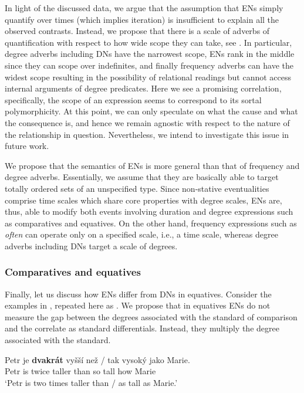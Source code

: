 \documentclass[output=paper,modfonts,hidelinks,newtxmath
\ChapterDOI{10.5281/zenodo.2545513}
]{langscibook}
\begin{document}
\noindent In light of the discussed data, we argue that the assumption that ENs simply quantify over times (which implies iteration) is insufficient to explain all the observed contrasts. Instead, we propose that there is a scale of adverbs of quantification with respect to how wide scope they can take, see . In particular, degree adverbs including DNs have the narrowest scope, ENs rank in the middle since they can scope over indefinites, and finally frequency adverbs can have the widest scope resulting in the possibility of relational readings but cannot access internal arguments of degree predicates. Here we see a promising correlation, specifically, the scope of an expression seems to correspond to its sortal polymorphicity. At this point, we can only speculate on what the cause and what the consequence is, and hence we remain agnostic with respect to the nature of the relationship in question. Nevertheless, we intend to investigate this issue in future work.


We propose that the semantics of ENs is more general than that of frequency and degree adverbs. Essentially, we assume that they are basically able to target totally ordered sets of an unspecified type. Since non-stative eventualities comprise time scales which share core properties with degree scales, ENs are, thus, able to modify both events involving duration and degree expressions such as comparatives and equatives. On the other hand, frequency expressions such as \textit{often} can operate only on a specified scale, i.e., a time scale, whereas degree adverbs including DNs target a scale of degrees.

\subsubsection{Comparatives and equatives}\label{comparatives-and-equatives}

Finally, let us discuss how ENs differ from DNs in equatives. Consider the examples in , repeated here as . We propose that in equatives ENs do not measure the gap between the degrees associated with the standard of comparison and the correlate as standard differentials. Instead, they multiply the degree associated with the standard.

\ea\label{comp-eq-dvakrat} \gll Petr je \textbf{dvakrát} vyšší než / tak vysoký jako Marie.\\
Petr is twice taller than {} so tall how Marie\\
\glt `Petr is two times taller than / as tall as Marie.'
\z
\end{document}
